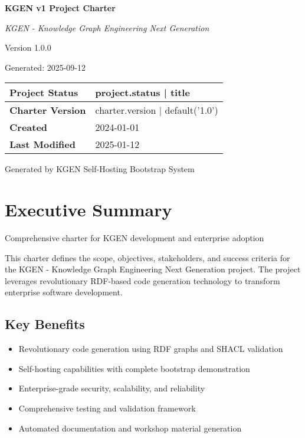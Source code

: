 \documentclass[11pt,a4paper]{article}
\begin{document}
\begin{titlepage}
    \centering
    {\Huge\bfseries KGEN v1 Project Charter\par}
    \vspace{1.5cm}
    {\Large\itshape KGEN - Knowledge Graph Engineering Next Generation\par}
    \vspace{1cm}
    {\large Version 1.0.0\par}
    \vspace{0.5cm}
    {\large Generated: 2025-09-12\par}
    \vspace{2cm}
    
    \begin{center}
    \begin{tabular}{|l|l|}
    \hline
    \textbf{Project Status} & {{ project.status | title }} \\
    \hline
    \textbf{Charter Version} & {{ charter.version | default('1.0') }} \\
    \hline
    \textbf{Created} & 2024-01-01 \\
    \hline
    \textbf{Last Modified} & 2025-01-12 \\
    \hline
    \end{tabular}
    \end{center}
    
    \vfill
    {\large\textcolor{kgengray}{Generated by KGEN Self-Hosting Bootstrap System}\par}
\end{titlepage}

\tableofcontents
\newpage

\section{Executive Summary}

Comprehensive charter for KGEN development and enterprise adoption

This charter defines the scope, objectives, stakeholders, and success criteria for the KGEN - Knowledge Graph Engineering Next Generation project. The project leverages revolutionary RDF-based code generation technology to transform enterprise software development.

\subsection{Key Benefits}
\begin{itemize}[leftmargin=2cm]
    \item Revolutionary code generation using RDF graphs and SHACL validation
    \item Self-hosting capabilities with complete bootstrap demonstration
    \item Enterprise-grade security, scalability, and reliability
    \item Comprehensive testing and validation framework
    \item Automated documentation and workshop material generation
\end{itemize}
\end{document}
